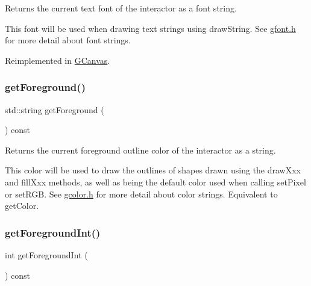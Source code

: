 Returns the current text font of the interactor as a font string. 

This font will be used when drawing text strings using draw\+String. See \mbox{\hyperlink{gfont_8h_source}{gfont.\+h}} for more detail about font strings. 

Reimplemented in \mbox{\hyperlink{classGCanvas_a24420d98f18927d2c201a3ab55ffdcec}{G\+Canvas}}.

\mbox{\label{classGDrawingSurface_a4fa2d8b0192a3a5b4af4bbfe71194d03}} 
\subsubsection{\texorpdfstring{get\+Foreground()}{getForeground()}}
{\footnotesize\ttfamily std\+::string get\+Foreground (\begin{DoxyParamCaption}{ }\end{DoxyParamCaption}) const\hspace{0.3cm}{\ttfamily [virtual]}}



Returns the current foreground outline color of the interactor as a string. 

This color will be used to draw the outlines of shapes drawn using the draw\+Xxx and fill\+Xxx methods, as well as being the default color used when calling set\+Pixel or set\+R\+GB. See \mbox{\hyperlink{gcolor_8h_source}{gcolor.\+h}} for more detail about color strings. Equivalent to get\+Color. \mbox{\label{classGDrawingSurface_ac3b12ab385a6ef9ae90fc879860ba726}} 
\subsubsection{\texorpdfstring{get\+Foreground\+Int()}{getForegroundInt()}}
{\footnotesize\ttfamily int get\+Foreground\+Int (\begin{DoxyParamCaption}{ }\end{DoxyParamCaption}) const\hspace{0.3cm}{\ttfamily [virtual]}}



